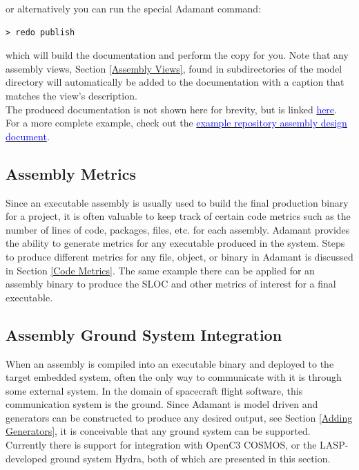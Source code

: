 or alternatively you can run the special Adamant command:

\vspace{5mm} %
\begin{verbatim}
> redo publish
\end{verbatim}
\vspace{5mm} %

which will build the documentation and perform the copy for you. Note that any assembly views, Section \ref{Assembly Views}, found in subdirectories of the model directory will automatically be added to the documentation with a caption that matches the view's description. \\

The produced documentation is not shown here for brevity, but is linked \href{https://github.com/lasp/adamant/blob/main/doc/example_architecture/doc/science_assembly.pdf}{\textcolor{blue}{here}}. For a more complete example, check out the \href{https://github.com/lasp/adamant_example/blob/main/src/assembly/linux/doc/linux_example.pdf}{\textcolor{blue}{example repository assembly design document}}.

\subsection{Assembly Metrics}

Since an executable assembly is usually used to build the final production binary for a project, it is often valuable to keep track of certain code metrics such as the number of lines of code, packages, files, etc. for each assembly. Adamant provides the ability to generate metrics for any executable produced in the system. Steps to produce different metrics for any file, object, or binary in Adamant is discussed in Section \ref{Code Metrics}. The same example there can be applied for an assembly binary to produce the SLOC and other metrics of interest for a final executable.

\subsection{Assembly Ground System Integration}

When an assembly is compiled into an executable binary and deployed to the target embedded system, often the only way to communicate with it is through some external system. In the domain of spacecraft flight software, this communication system is the ground. Since Adamant is model driven and generators can be constructed to produce any desired output, see Section \ref{Adding Generators}, it is conceivable that any ground system can be supported. Currently there is support for integration with OpenC3 COSMOS, or the LASP-developed ground system Hydra, both of which are presented in this section.

